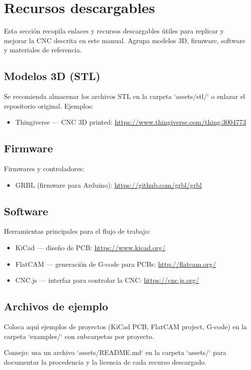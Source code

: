 \chapter{Recursos descargables}
\label{ch:resources}

Esta sección recopila enlaces y recursos descargables útiles para replicar y mejorar la CNC descrita en este manual. Agrupa modelos 3D, firmware, software y materiales de referencia.

\section*{Modelos 3D (STL)}
Se recomienda almacenar los archivos STL en la carpeta `assets/stl/` o enlazar el repositorio original. Ejemplos:
\begin{itemize}
  \item Thingiverse — CNC 3D printed: \href{https://www.thingiverse.com/thing:3004773}{https://www.thingiverse.com/thing:3004773}
\end{itemize}

\section*{Firmware}
Firmwares y controladores:
\begin{itemize}
  \item GRBL (firmware para Arduino): \href{https://github.com/grbl/grbl}{https://github.com/grbl/grbl}
\end{itemize}

\section*{Software}
Herramientas principales para el flujo de trabajo:
\begin{itemize}
  \item KiCad — diseño de PCB: \href{https://www.kicad.org/}{https://www.kicad.org/}
  \item FlatCAM — generación de G-code para PCBs: \href{http://flatcam.org/}{http://flatcam.org/}
  \item CNC.js — interfaz para controlar la CNC: \href{https://cnc.js.org/}{https://cnc.js.org/}
\end{itemize}

\section*{Archivos de ejemplo}
Coloca aquí ejemplos de proyectos (KiCad PCB, FlatCAM project, G-code) en la carpeta `examples/` con subcarpetas por proyecto.

\begin{notebox}
Consejo: usa un archivo `assets/README.md` en la carpeta `assets/` para documentar la procedencia y la licencia de cada recurso descargado.
\end{notebox}

